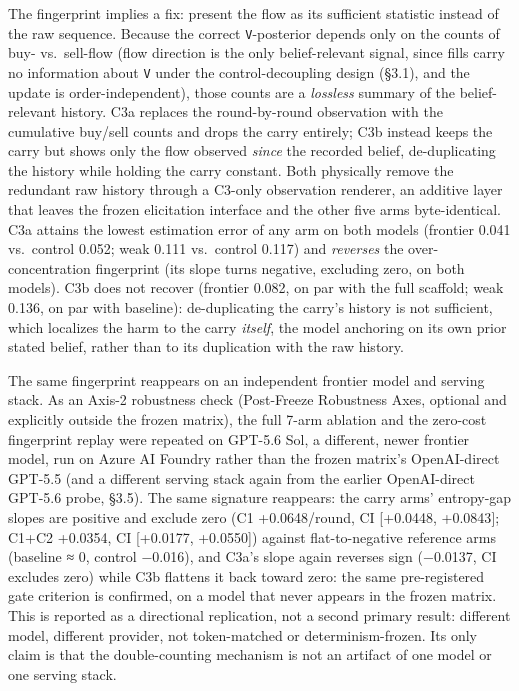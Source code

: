 \documentclass[
  11pt,
]{article}
\begin{document}
The fingerprint implies a fix: present the flow as its sufficient statistic instead of the raw sequence. Because the correct \texttt{V}-posterior depends only on the counts of buy- vs.~sell-flow (flow direction is the only belief-relevant signal, since fills carry no information about \texttt{V} under the control-decoupling design (§3.1), and the update is order-independent), those counts are a \emph{lossless} summary of the belief-relevant history. C3a replaces the round-by-round observation with the cumulative buy/sell counts and drops the carry entirely; C3b instead keeps the carry but shows only the flow observed \emph{since} the recorded belief, de-duplicating the history while holding the carry constant. Both physically remove the redundant raw history through a C3-only observation renderer, an additive layer that leaves the frozen elicitation interface and the other five arms byte-identical. C3a attains the lowest estimation error of any arm on both models (frontier 0.041 vs.~control 0.052; weak 0.111 vs.~control 0.117) and \emph{reverses} the over-concentration fingerprint (its slope turns negative, excluding zero, on both models). C3b does not recover (frontier 0.082, on par with the full scaffold; weak 0.136, on par with baseline): de-duplicating the carry's history is not sufficient, which localizes the harm to the carry \emph{itself}, the model anchoring on its own prior stated belief, rather than to its duplication with the raw history.

The same fingerprint reappears on an independent frontier model and serving stack. As an Axis-2 robustness check (Post-Freeze Robustness Axes, optional and explicitly outside the frozen matrix), the full 7-arm ablation and the zero-cost fingerprint replay were repeated on GPT-5.6 Sol, a different, newer frontier model, run on Azure AI Foundry rather than the frozen matrix's OpenAI-direct GPT-5.5 (and a different serving stack again from the earlier OpenAI-direct GPT-5.6 probe, §3.5). The same signature reappears: the carry arms' entropy-gap slopes are positive and exclude zero (C1 +0.0648/round, CI {[}+0.0448, +0.0843{]}; C1+C2 +0.0354, CI {[}+0.0177, +0.0550{]}) against flat-to-negative reference arms (baseline ≈ 0, control −0.016), and C3a's slope again reverses sign (−0.0137, CI excludes zero) while C3b flattens it back toward zero: the same pre-registered gate criterion is confirmed, on a model that never appears in the frozen matrix. This is reported as a directional replication, not a second primary result: different model, different provider, not token-matched or determinism-frozen. Its only claim is that the double-counting mechanism is not an artifact of one model or one serving stack.
\end{document}
